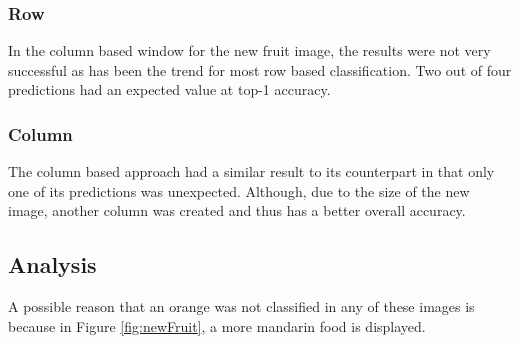 \subsubsection*{Row}
In the column based window for the new fruit image, the results were not very
successful as has been the trend for most row based classification. Two out of
four predictions had an expected value at top-1 accuracy.

\subsubsection*{Column}
The column based approach had a similar result to its counterpart in that only
one of its predictions was unexpected. Although, due  to the size of the new
image, another column was created and thus has a better overall accuracy.

\subsection*{Analysis}
A possible reason that an orange was not classified in any of these images is
because in Figure \ref{fig:newFruit}, a more mandarin food is displayed.
